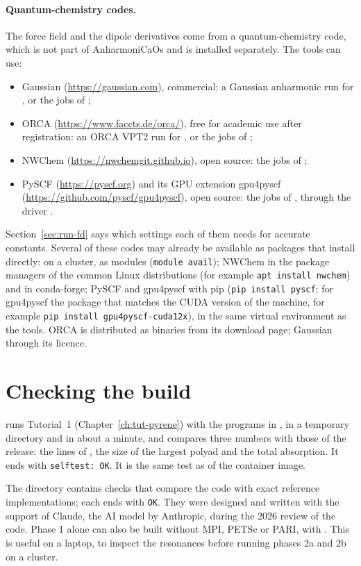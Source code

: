 \paragraph{Quantum-chemistry codes.} The force field and the dipole
derivatives come from a quantum-chemistry code, which is not part of
AnharmoniCaOs and is installed separately. The tools can use:
\begin{itemize}
\item Gaussian (\url{https://gaussian.com}), commercial: a Gaussian
  anharmonic run for , or the jobs of
  ;
\item ORCA (\url{https://www.faccts.de/orca/}), free for academic use
  after registration: an ORCA VPT2 run for , or the jobs
  of ;
\item NWChem (\url{https://nwchemgit.github.io}), open source: the jobs of
  ;
\item PySCF (\url{https://pyscf.org}) and its GPU extension gpu4pyscf
  (\url{https://github.com/pyscf/gpu4pyscf}), open source: the jobs of
  , through the driver .
\end{itemize}
Section~\ref{sec:run-fd} says which settings each of them needs for
accurate constants. Several of these codes may already be available as
packages that install directly: on a cluster, as modules
(\texttt{module avail}); NWChem in the package managers of the common
Linux distributions (for example \texttt{apt install nwchem}) and in
conda-forge; PySCF and gpu4pyscf with pip (\texttt{pip install pyscf};
for gpu4pyscf the package that matches the CUDA version of the machine,
for example \texttt{pip install gpu4pyscf-cuda12x}), in the same virtual
environment as the tools. ORCA is distributed as binaries from its
download page; Gaussian through its licence.

\section{Checking the build}\label{sec:checks}

 runs Tutorial~1
(Chapter~\ref{ch:tut-pyrene}) with the programs in , in a
temporary directory and in about a minute, and compares three numbers with
those of the release: the lines of , the size of the
largest polyad and the total absorption. It ends with
\texttt{selftest: OK}. It is the same test as  of the
container image.

The directory  contains checks that compare the
code with exact reference implementations; each  ends with
\texttt{OK}. They were designed and written with the support of Claude,
the AI model by Anthropic, during the 2026 review of the code. Phase 1
alone can also be built without MPI, PETSc or PARI, with
. This is useful
on a laptop, to inspect the resonances before running phases 2a and 2b on
a cluster.
